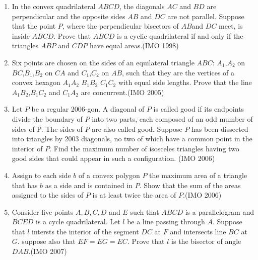\begin{enumerate}[label=\thesubsection.\arabic*,ref=\thesubsection.\theenumi]
\item In the convex quadrilateral $ABCD$, the diagonals $AC$ and $BD$ are perpendicular and the opposite sides $AB$ and $DC$ are not parallel. Suppose that the point $P$, where the perpendicular bisectors of $AB$and $DC$ meet, is inside $ABCD$. Prove that $ABCD$ is a cyclic quadrilateral if and only if the triangles $ABP$ and $CDP$ have equal areas.\hfill(IMO  1998) 
	\item Six points are chosen on the sides of an equilateral triangle $ABC$:
     $A_1$,$A_2$ on $BC$,$B_1$,$B_2$ on $CA$ and $C_1$,$C_2$ on $AB$, such that they are the vertices of a convex hexagon $A_1A_2$ $B_1B_2$ $C_1C_2$ with equal side lengths. Prove that the line $A_1B_2$,$B_1C_2$ and $C_1A_2$ are concurrent.\hfill(IMO  2005)
\item Let $P$ be a regular 2006-gon. A diagonal of $P$ is called good if its endpoints divide the boundary of $P$ into two parts, cach composed of an odd mumber of sides of P. The sides of $P$ are also called good. Suppose $P$ has been dissected into triangles by 2003 diagonals, no two of which have a common point in the interior of $P$. Find the maximum number  of isosceles triangles having two good sides that could appear in such a configuration. \hfill(IMO  2006)
\item Assign to each side $b$ of a convex polygon $P$ the maximum area of a triangle that has $b$ as a side and is contained in $P$. Show that the sum of the areas assigned to the sides of $P$ is at least twice the area of $P$.\hfill(IMO  2006)
\item Consider five points $A,B,C,D$ and $E$ such that $ABCD$ is a parallelogram and $BCED$ is a cycle quadrilateral. Let $l$ be a line passing through $A$. Suppose that $l$ intersts the interior of the segment $DC$ at $F$ and intersects line $BC$ at $G$. suppose also that $EF=EG=EC$. Prove that $l$ is the bisector of angle $DAB$.\hfill(IMO  2007)

\end{enumerate}
